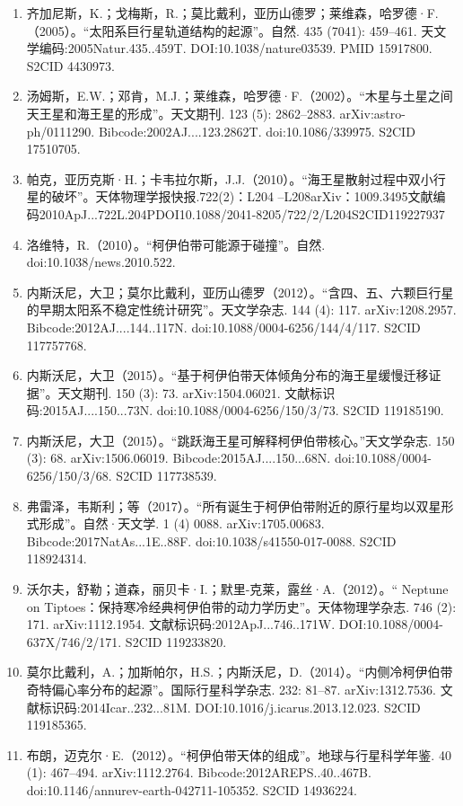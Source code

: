 \begin{enumerate}
\item 齐加尼斯，K.；戈梅斯，R.；莫比戴利，亚历山德罗；莱维森，哈罗德·F.（2005）。“太阳系巨行星轨道结构的起源”。自然. 435 (7041): 459–461. 天文学编码:2005Natur.435..459T. DOI:10.1038/nature03539. PMID 15917800. S2CID 4430973.
\item 汤姆斯，E.W.；邓肯，M.J.；莱维森，哈罗德·F.（2002）。“木星与土星之间天王星和海王星的形成”。天文期刊. 123 (5): 2862–2883. arXiv:astro-ph/0111290. Bibcode:2002AJ....123.2862T. doi:10.1086/339975. S2CID 17510705.
\item 帕克，亚历克斯·H.；卡韦拉尔斯，J.J.（2010）。“海王星散射过程中双小行星的破坏”。天体物理学报快报.722(2)：L204 –L208arXiv：1009.3495文献编码2010ApJ...722L.204PDOI10.1088/2041-8205/722/2/L204S2CID119227937
\item 洛维特，R.（2010）。“柯伊伯带可能源于碰撞”。自然. doi:10.1038/news.2010.522.
\item 内斯沃尼，大卫；莫尔比戴利，亚历山德罗（2012）。“含四、五、六颗巨行星的早期太阳系不稳定性统计研究”。天文学杂志. 144 (4): 117. arXiv:1208.2957. Bibcode:2012AJ....144..117N. doi:10.1088/0004-6256/144/4/117. S2CID 117757768.
\item 内斯沃尼，大卫（2015）。“基于柯伊伯带天体倾角分布的海王星缓慢迁移证据”。天文期刊. 150 (3): 73. arXiv:1504.06021. 文献标识码:2015AJ....150...73N. doi:10.1088/0004-6256/150/3/73. S2CID 119185190.
\item 内斯沃尼，大卫（2015）。“跳跃海王星可解释柯伊伯带核心。”天文学杂志. 150 (3): 68. arXiv:1506.06019. Bibcode:2015AJ....150...68N. doi:10.1088/0004-6256/150/3/68. S2CID 117738539.
\item 弗雷泽，韦斯利；等（2017）。“所有诞生于柯伊伯带附近的原行星均以双星形式形成”。自然·天文学. 1 (4) 0088. arXiv:1705.00683. Bibcode:2017NatAs...1E..88F. doi:10.1038/s41550-017-0088. S2CID 118924314.
\item 沃尔夫，舒勒；道森，丽贝卡·I.；默里-克莱，露丝·A.（2012）。“ Neptune on Tiptoes：保持寒冷经典柯伊伯带的动力学历史”。天体物理学杂志. 746 (2): 171. arXiv:1112.1954. 文献标识码:2012ApJ...746..171W. DOI:10.1088/0004-637X/746/2/171. S2CID 119233820.
\item 莫尔比戴利，A.；加斯帕尔，H.S.；内斯沃尼，D.（2014）。“内侧冷柯伊伯带奇特偏心率分布的起源”。国际行星科学杂志. 232: 81–87. arXiv:1312.7536. 文献标识码:2014Icar..232...81M. DOI:10.1016/j.icarus.2013.12.023. S2CID 119185365.
\item 布朗，迈克尔·E.（2012）。“柯伊伯带天体的组成”。地球与行星科学年鉴. 40 (1): 467–494. arXiv:1112.2764. Bibcode:2012AREPS..40..467B. doi:10.1146/annurev-earth-042711-105352. S2CID 14936224.

\end{enumerate}
